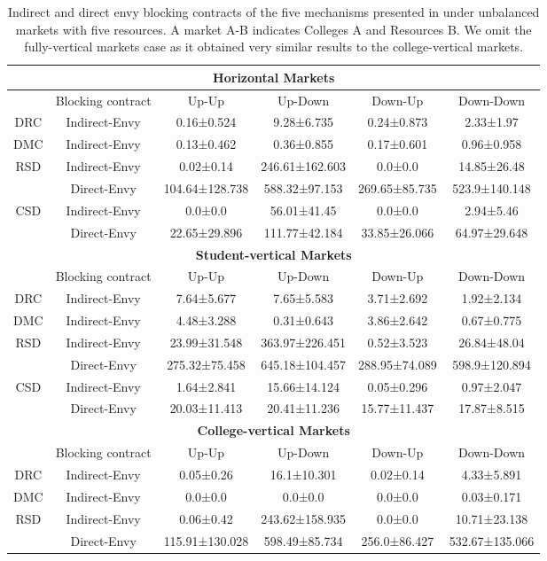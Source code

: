 \begin{table}[ht]
\caption{Indirect and direct envy blocking contracts of the five mechanisms presented in  under unbalanced markets with five resources. A market A-B indicates Colleges A and Resources B. We omit the fully-vertical markets case as it obtained very similar results to the college-vertical markets.}
\centering
\begin{tabular}{cccccc}
\toprule
\multicolumn{6}{c}{\textbf{Horizontal Markets}} \\
\toprule
 & Blocking contract & Up-Up & Up-Down & Down-Up & Down-Down \\
\hline
DRC & Indirect-Envy & 0.16±0.524 &  9.28±6.735 & 0.24±0.873 & 2.33±1.97\\
\hline
DMC & Indirect-Envy & 0.13±0.462 &  0.36±0.855 & 0.17±0.601 & 0.96±0.958 \\
\hline
\multirow{2}{*}{RSD} & Indirect-Envy &  0.02±0.14  &  246.61±162.603 & 0.0±0.0 & 14.85±26.48 \\
\cline{2-6}
& Direct-Envy & 104.64±128.738 & 588.32±97.153  & 269.65±85.735 & 523.9±140.148\\
\hline
\multirow{2}{*}{CSD} & Indirect-Envy &  0.0±0.0 & 56.01±41.45 & 0.0±0.0 & 2.94±5.46\\
\cline{2-6}
& Direct-Envy & 22.65±29.896 & 111.77±42.184 & 33.85±26.066 & 64.97±29.648  \\
\toprule
\multicolumn{6}{c}{\textbf{Student-vertical Markets}} \\
\toprule
 & Blocking contract & Up-Up & Up-Down & Down-Up & Down-Down \\
\hline
DRC & Indirect-Envy & 7.64±5.677 & 7.65±5.583  & 3.71±2.692 & 1.92±2.134\\
\hline
DMC & Indirect-Envy & 4.48±3.288  &  0.31±0.643 & 3.86±2.642  & 0.67±0.775\\
\hline
\multirow{2}{*}{RSD} & Indirect-Envy & 23.99±31.548 & 363.97±226.451 & 0.52±3.523 & 26.84±48.04 \\
\cline{2-6}
& Direct-Envy & 275.32±75.458 & 645.18±104.457  & 288.95±74.089 & 598.9±120.894 \\
\hline
\multirow{2}{*}{CSD} & Indirect-Envy &  1.64±2.841  & 15.66±14.124 &  0.05±0.296 & 0.97±2.047\\
\cline{2-6}
& Direct-Envy &20.03±11.413 & 20.41±11.236 & 15.77±11.437 & 17.87±8.515\\
\toprule
\multicolumn{6}{c}{\textbf{College-vertical Markets}} \\
\toprule
 & Blocking contract & Up-Up & Up-Down & Down-Up & Down-Down \\
\hline
DRC & Indirect-Envy & 0.05±0.26 & 16.1±10.301  &  0.02±0.14 & 4.33±5.891 \\
\hline
DMC & Indirect-Envy & 0.0±0.0 & 0.0±0.0 & 0.0±0.0 &  0.03±0.171\\
\hline
\multirow{2}{*}{RSD} & Indirect-Envy & 0.06±0.42  &  243.62±158.935  &0.0±0.0 & 10.71±23.138\\
\cline{2-6}
& Direct-Envy & 115.91±130.028 & 598.49±85.734 & 256.0±86.427  & 532.67±135.066\\
\toprule
\end{tabular}
\label{tab:stability_unbalanced_markets}
\end{table}